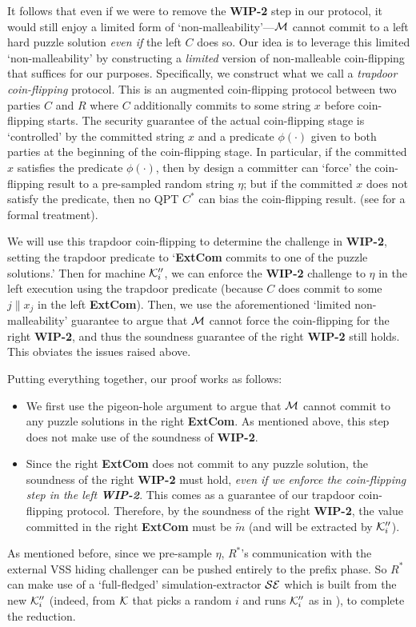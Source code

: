 It follows that even if we were to remove the {\bf WIP-2} step in our protocol, it would still enjoy a limited form of `non-malleability'---$\mathcal{M}$ cannot commit to a left hard puzzle solution {\em even if} the left $C$ does so. Our idea is to leverage this limited `non-malleability' by constructing a {\em limited} version of non-malleable coin-flipping that suffices for our purposes. Specifically, we construct what we call a {\em trapdoor coin-flipping} protocol. This is an augmented coin-flipping protocol between two parties $C$ and $R$ where $C$ additionally commits to some string $x$ before coin-flipping starts. The security guarantee of the actual coin-flipping stage is `controlled' by the committed string $x$ and a predicate $\phi(\cdot)$ given to both parties at the beginning of the coin-flipping stage. In particular, if the committed $x$ satisfies the predicate $\phi(\cdot)$, then by design a committer can `force' the coin-flipping result to a pre-sampled random string $\eta$; but if the committed $x$ does not satisfy the predicate, then no QPT $C^*$ can bias the coin-flipping result. (see  for a formal treatment).

We will use this trapdoor coin-flipping to determine the challenge in {\bf WIP-2}, setting the trapdoor predicate to `{\bf ExtCom} commits to one of the puzzle solutions.' Then for machine $\mathcal{K}''_i$, we can enforce the {\bf WIP-2} challenge to $\eta$ in the left execution using the trapdoor predicate (because $C$ does commit to some $j\|x_j$ in the left {\bf ExtCom}). Then, we use the aforementioned `limited non-malleability' guarantee to argue that $\mathcal{M}$ cannot force the coin-flipping for the right {\bf WIP-2}, and thus the soundness guarantee of the right {\bf WIP-2} still holds. This obviates the issues raised above. 

Putting everything together, our proof works as follows: 
\begin{itemize}
      \item
      We first use the \cite{FOCS:LPY23} pigeon-hole argument to argue that $\mathcal{M}$ cannot commit to any puzzle solutions in the right {\bf ExtCom}. As mentioned above, this step does not make use of the soundness of {\bf WIP-2}.
      \item 
      Since the right {\bf ExtCom} does not commit to any puzzle solution, the soundness of the right {\bf WIP-2} must hold, {\em even if we enforce the coin-flipping step in the left {\bf WIP-2}}. This comes as a guarantee of our trapdoor coin-flipping protocol. Therefore, by the soundness of the right {\bf WIP-2}, the value committed in the right  {\bf ExtCom} must be $\tilde{m}$ (and will be extracted by $\mathcal{K}''_i$).
\end{itemize}
As mentioned before, since we pre-sample $\eta$, $R^*$'s communication with the external VSS hiding challenger can be pushed entirely to the prefix phase. So $R^*$ can make use of a `full-fledged' simulation-extractor $\mathcal{SE}$ which is built from the new $\mathcal{K}''_i$ (indeed, from $\mathcal{K}$ that picks a random $i$ and runs $\mathcal{K}''_i$ as in \cite{FOCS:LPY23}), to complete the reduction.

